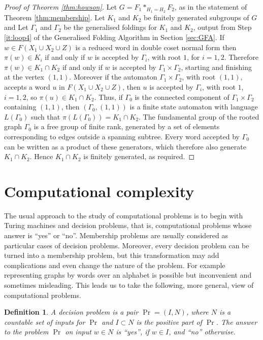 \documentclass[a4paper,12pt]{article}
\newcommand{\G}{\Gamma }
\newtheorem{definition}[theorem]{Definition}
\numberwithin{equation}{section}
\numberwithin{figure}{section}
\begin{document}
\begin{proof}[Proof of Theorem \ref{thm:howson}]
Let $G=F_1*_{H_1=H_2} F_2$, 
as in the statement of Theorem \ref{thm:membership}. 
Let $K_1$ and $K_2$ be finitely generated subgroups of $G$ and 
Let $\G_1$ and $\G_2$ be the generalised foldings for $K_1$ and 
$K_2$, output from Step \ref{it:loop4} of the Generalised Folding Algorithm in
Section \ref{sec:GFA}. If $w\in F(X_1\cup X_2\cup Z)$ is a reduced word in
double coset normal form then $\pi(w)\in K_i$ if and only if $w$ is
accepted by $\G_i$, with root $1$, for $i=1,2$. Therefore $\pi(w)\in K_1\cap K_2$ if and only if $w$ is accepted by $\G_1\times \G_2$, starting and finishing
at the vertex  
$(1,1)$.  Moreover if the automaton $\G_1\times \G_2$, with root $(1,1)$,
 accepts a word $u$ in $F(X_1\cup X_2\cup Z)$, then $u$ is accepted by
$\G_i$, with root $1$, $i=1,2$, so $\pi(u)\in K_1\cap K_2$. Thus, if
$\G_0$ is the connected component of $\G_1\times \G_2$ containing $(1,1)$, then
$(\G_0,(1,1))$ is a finite state automaton with 
language $L(\G_0)$ such that $\pi(L(\G_0))=K_1\cap K_2$. The fundamental
group of the rooted graph $\G_0$ is a free group of finite rank, generated
by a set of elements corresponding to edges outside a spanning subtree. 
Every word accepted by $\G_0$ can be written as a product of these
generators, which therefore also generate $K_1\cap K_2$. Hence 
$K_1\cap K_2$ is finitely generated, as required. 
\end{proof}
\section{Computational complexity}\label{sec:TC}
The usual approach to the study of computational problems is to
begin with Turing machines and decision
problems, that is, computational problems whose answer is ``yes'' or
``no''. Membership problems are usually considered as particular
cases of decision problems.
Moreover, every decision problem can be turned into a membership
problem, but this transformation may add complications and even
change the nature of the problem. For example representing graphs by
words over an alphabet is possible but inconvenient and sometimes
misleading. This leads us to take the following, more general, view of computational
problems.
\begin{definition}
A \emph{decision problem} is a pair $\Pr = (I,N)$, where $N$ is a countable
set of \emph{inputs} for $\Pr$ and $I\subset N$ is the \emph{positive part} of
$\Pr$. The \emph{answer} to the problem $\Pr$ on  input $w\in N$ is ``yes'',
if $w\in I$,
and ``no'' otherwise. 

\end{definition}
\end{document}
